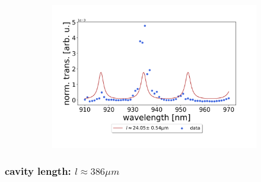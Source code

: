 \begin{figure}[h!]
\begin{subfigure}[b]{0.49\textwidth}
        \includegraphics[width=\textwidth]{figures/results/single fano fits/5um_off_res_fabry_perot_3.png}
        \caption{}
        \label{fig:5um_off_res_fabry_perot}
    \end{subfigure}
\end{figure}

\clearpage
\subsubsection*{cavity length: $l \approx 386 \mu m$}


